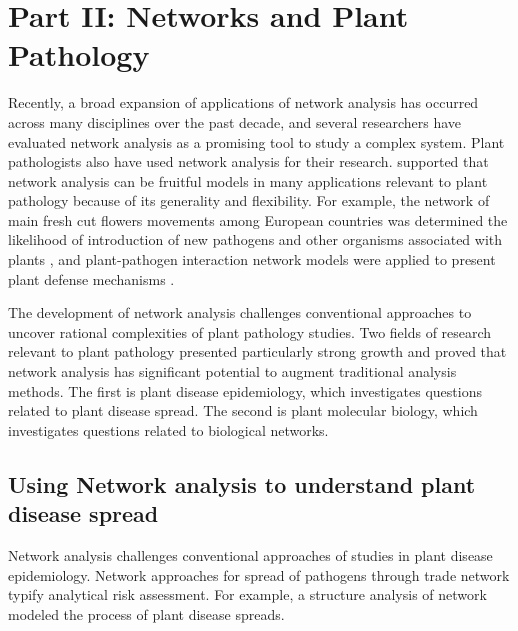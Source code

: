 \section*{Part II: Networks and Plant Pathology}

Recently, a broad expansion of applications of network analysis has occurred across many disciplines over the past decade, and several researchers have evaluated network analysis as a promising tool to study a complex system. Plant pathologists also have used network analysis for their research.  supported that network analysis can be fruitful models in many applications relevant to plant pathology because of its generality and flexibility. For example, the network of main fresh cut flowers movements among European countries was determined the likelihood of introduction of new pathogens and other organisms associated with plants , and plant-pathogen interaction network models were applied to present plant defense mechanisms .

The development of network analysis challenges conventional approaches to uncover rational complexities of plant pathology studies. Two fields of research relevant to plant pathology presented particularly strong growth and proved that network analysis has significant potential to augment traditional analysis methods. The first is plant disease epidemiology, which investigates questions related to plant disease spread. The second is plant molecular biology, which investigates questions related to biological networks.


\subsection*{Using Network analysis to understand plant disease spread}

Network analysis challenges conventional approaches of studies in plant disease epidemiology. Network approaches for spread of pathogens through trade network typify analytical risk assessment.
For example, a structure analysis of network modeled the process of plant disease spreads.

